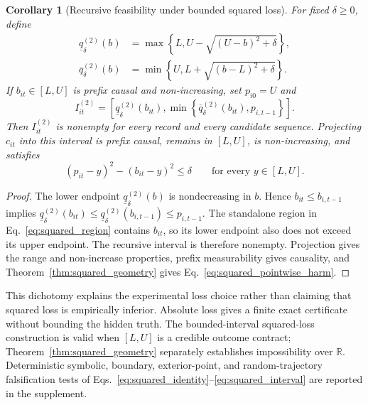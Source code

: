 \documentclass[11pt]{article}
\newtheorem{corollary}{Corollary}
\newcommand{\R}{\mathbb{R}}
\begin{document}
\begin{corollary}[Recursive feasibility under bounded squared loss]
\label{cor:squared_recursive}
For fixed $\delta\geq0$, define
\begin{align}
  \underline q^{(2)}_{\delta}(b)
  &=\max\!\left\{L,U-\sqrt{(U-b)^2+\delta}\right\},\\
  \overline q^{(2)}_{\delta}(b)
  &=\min\!\left\{U,L+\sqrt{(b-L)^2+\delta}\right\}.
  \label{eq:squared_bounds}
\end{align}
If $b_{it}\in[L,U]$ is prefix causal and non-increasing, set $p_{i0}=U$ and
\begin{equation}
  I^{(2)}_{it}
  =\left[
  \underline q^{(2)}_{\delta}(b_{it}),
  \min\!\left\{\overline q^{(2)}_{\delta}(b_{it}),p_{i,t-1}\right\}
  \right].
  \label{eq:squared_interval}
\end{equation}
Then $I^{(2)}_{it}$ is nonempty for every record and every candidate sequence. Projecting $c_{it}$ into this interval is prefix causal, remains in $[L,U]$, is non-increasing, and satisfies
\begin{equation}
  (p_{it}-y)^2-(b_{it}-y)^2\leq\delta
  \qquad\text{for every }y\in[L,U].
  \label{eq:squared_pointwise_harm}
\end{equation}
\end{corollary}
\begin{proof}
The lower endpoint $\underline q^{(2)}_{\delta}(b)$ is nondecreasing in $b$. Hence $b_{it}\leq b_{i,t-1}$ implies $\underline q^{(2)}_{\delta}(b_{it})\leq\underline q^{(2)}_{\delta}(b_{i,t-1})\leq p_{i,t-1}$. The standalone region in Eq.~\eqref{eq:squared_region} contains $b_{it}$, so its lower endpoint also does not exceed its upper endpoint. The recursive interval is therefore nonempty. Projection gives the range and non-increase properties, prefix measurability gives causality, and Theorem~\ref{thm:squared_geometry} gives Eq.~\eqref{eq:squared_pointwise_harm}.
\end{proof}

This dichotomy explains the experimental loss choice rather than claiming that squared loss is empirically inferior. Absolute loss gives a finite exact certificate without bounding the hidden truth. The bounded-interval squared-loss construction is valid when $[L,U]$ is a credible outcome contract; Theorem~\ref{thm:squared_geometry} separately establishes impossibility over $\R$. Deterministic symbolic, boundary, exterior-point, and random-trajectory falsification tests of Eqs.~\eqref{eq:squared_identity}--\eqref{eq:squared_interval} are reported in the supplement.
\end{document}
